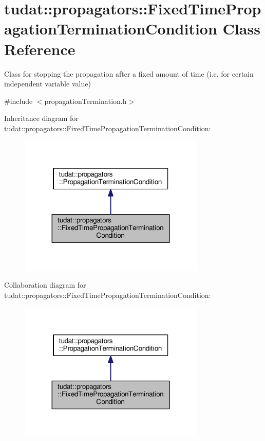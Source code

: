 \hypertarget{classtudat_1_1propagators_1_1FixedTimePropagationTerminationCondition}{}\section{tudat\+:\+:propagators\+:\+:Fixed\+Time\+Propagation\+Termination\+Condition Class Reference}
\label{classtudat_1_1propagators_1_1FixedTimePropagationTerminationCondition}


Class for stopping the propagation after a fixed amount of time (i.\+e. for certain independent variable value)  




{\ttfamily \#include $<$propagation\+Termination.\+h$>$}



Inheritance diagram for tudat\+:\+:propagators\+:\+:Fixed\+Time\+Propagation\+Termination\+Condition\+:
\nopagebreak
\begin{figure}[H]
\begin{center}
\leavevmode
\includegraphics[width=251pt]{classtudat_1_1propagators_1_1FixedTimePropagationTerminationCondition__inherit__graph}
\end{center}
\end{figure}


Collaboration diagram for tudat\+:\+:propagators\+:\+:Fixed\+Time\+Propagation\+Termination\+Condition\+:
\nopagebreak
\begin{figure}[H]
\begin{center}
\leavevmode
\includegraphics[width=251pt]{classtudat_1_1propagators_1_1FixedTimePropagationTerminationCondition__coll__graph}
\end{center}
\end{figure}
